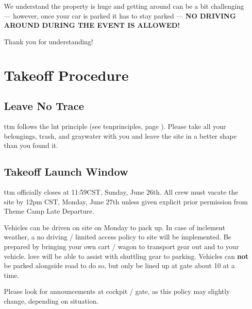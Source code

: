 
We understand the property is huge and getting around can be a bit challenging --- however, once your car is parked it has to stay parked --- \textbf{NO DRIVING AROUND DURING THE EVENT IS ALLOWED!}

Thank you for understanding!


\section*{Takeoff Procedure}
\subsection*{Leave No Trace}
\Gls{ttm} follows the \gls{lnt} principle (see \gls{tenprinciples}, page \pageref{tenprinciples}). Please take all your belongings, trash, and \gls{graywater} with you and leave the site in a better shape than you found it.

\subsection*{Takeoff Launch Window}

\Gls{ttm} officially closes at 11:59\pm CST, Sunday, June 26th.  All crew must vacate the site by 12pm CST, Monday, June 27th unless given explicit prior permission from Theme Camp Late Departure.

Vehicles can be driven on site on Monday to pack up. In case of inclement weather, a no driving / limited access policy to site will be implemented. Be prepared by bringing your own cart / wagon to transport gear out and to your vehicle.
\Gls{love} will be able to assist with shuttling gear to parking. 
Vehicles can \textbf{not} be parked alongside road to do so, but only be lined up at gate about 10 at a time.

Please look for announcements at \Gls{cockpit} / \Gls{gate}, as this policy may slightly change, depending on situation. 

